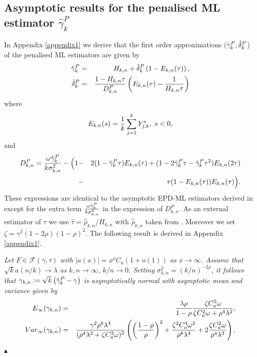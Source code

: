 \subsection{Asymptotic results for the penalised ML estimator $\hat{\gamma}^P_k$}

In Appendix \ref{appendix1} we derive that the first order approximations ($\hat{\gamma}_k^{P},\hat{\delta}_k^{P}$) of the penalised ML estimators are given by
\begin{eqnarray*}
	\hat{\gamma}_k^{P} & =& H_{k,n} +\hat{\delta}_k^{P} \left( 1-E_{k,n}(\tau) \right) ,\\
	\hat{\delta}_k^{P} &=& \frac{1-H_{k,n}\tau}{D^{P}_{k,n}} \left(E_{k,n}(\tau) - {1 \over H_{k,n}\tau} \right)
\end{eqnarray*}
where 
$$
E_{k,n}(s) = {1 \over k}\sum_{j=1}^k Y_{j,k}^{s},\; s < 0,
$$
and 
\begin{eqnarray*}
D^{P}_{k,n} =
{\omega \hat{\gamma}_k^{P} \over k\sigma^2_{k,n}} -
 \Big(1 &-& 2(1-\hat{\gamma}_k^{P} \tau) E_{k,n}(\tau)+ (1-2\hat{\gamma}_k^{P}\tau-\hat{\gamma}_k^{P}\tau^2)E_{k,n}(2\tau) \\ 
&-& \tau (1- E_{k,n}(\tau))E_{k,n}(\tau)\Big).
\end{eqnarray*}
These expressions are identical to the asymptotic EPD-ML estimators derived in \cite{beirlant2009second} except for the extra term ${\omega \hat{\gamma}_k^{P}\over k\sigma^2_{k,n}}$ in the expression of $D^{P}_{k,n}$. 
As an external estimator of $\tau$ we use $\hat{\tau} = \hat{\rho}_{k,n}/H_{k,n}$ with $\hat{\rho}_{k,n}$ taken from \cite{alves2003new}. Moreover we set $\zeta=\gamma^2 (1-2\rho)(1-\rho)^2$. The following result is derived in Appendix \ref{appendix1}. 
\\
\begin{theorem}\label{theorem11} {\it Let $F \in \mathcal{F}(\gamma,\tau)$ with $|a(x)| =x^{\rho }C_a (1+o(1))$ as $x \to \infty$. Assume that $\sqrt{k} a(n/k) \to \lambda$ as $k,n \to \infty$, $k/n \to 0$. Setting $\sigma_{k,n}^2= (k/n)^{-2\rho}$, it follows that $\gamma_{k,n}:=\sqrt{k} \left( \hat{\gamma}_k^{P}-\gamma \right)$ is asymptotically normal with asymptotic mean and variance given by
	\begin{eqnarray}
	E_{\infty} (\gamma_{k,n}) &=& 
	{\lambda \rho \over 1-\rho}{\zeta C_a^2 \omega \over \zeta C_a^2 \omega + \rho^4 \lambda^2}, 
	\label{Abias}\\
	Var_{\infty} (\gamma_{k,n})&=& {\gamma^2 \rho^8\lambda^4 \over (\rho^4\lambda^2+ \zeta C_a^2 \omega )^2}\left( \left({1-\rho \over \rho} \right)^2
	+ {\zeta^2 C_a^4 \omega^2 \over \rho^8 \lambda^4}+ 2{\zeta C_a^2 \omega \over \rho^4 \lambda^2}\right). 
	\label{Avar}
	\end{eqnarray}
	$\blacktriangle$
}
\end{theorem}

